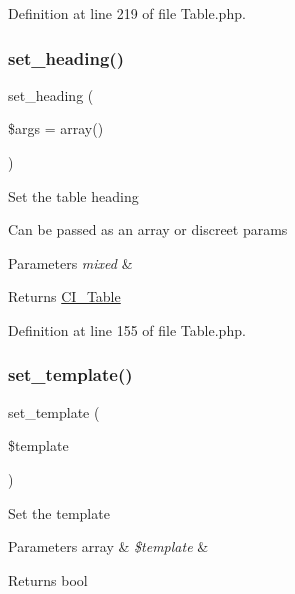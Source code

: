 Definition at line 219 of file Table.\+php.

\mbox{\label{class_c_i___table_ac35607094955ce966330d6af51d221ef}} 
\subsubsection{\texorpdfstring{set\_heading()}{set\_heading()}}
{\footnotesize\ttfamily set\+\_\+heading (\begin{DoxyParamCaption}\item[{}]{\$args = {\ttfamily array()} }\end{DoxyParamCaption})}

Set the table heading

Can be passed as an array or discreet params


\begin{DoxyParams}{Parameters}
{\em mixed} & \\
\hline
\end{DoxyParams}
\begin{DoxyReturn}{Returns}
\mbox{\hyperlink{class_c_i___table}{C\+I\+\_\+\+Table}} 
\end{DoxyReturn}


Definition at line 155 of file Table.\+php.

\mbox{\label{class_c_i___table_ae65d1ab2a626d4ddfda31befc2b347f6}} 
\subsubsection{\texorpdfstring{set\_template()}{set\_template()}}
{\footnotesize\ttfamily set\+\_\+template (\begin{DoxyParamCaption}\item[{}]{\$template }\end{DoxyParamCaption})}

Set the template


\begin{DoxyParams}[1]{Parameters}
array & {\em \$template} & \\
\hline
\end{DoxyParams}
\begin{DoxyReturn}{Returns}
bool 
\end{DoxyReturn}


